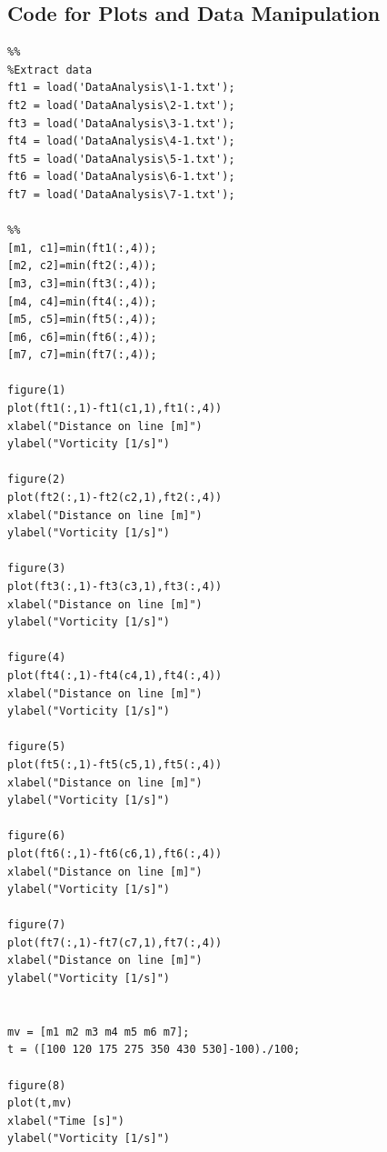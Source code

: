 \documentclass[12pt]{article}
\begin{document}
\subsection{Code for Plots and Data Manipulation}
\begin{lstlisting}
%%
%Extract data
ft1 = load('DataAnalysis\1-1.txt');
ft2 = load('DataAnalysis\2-1.txt');
ft3 = load('DataAnalysis\3-1.txt');
ft4 = load('DataAnalysis\4-1.txt');
ft5 = load('DataAnalysis\5-1.txt');
ft6 = load('DataAnalysis\6-1.txt');
ft7 = load('DataAnalysis\7-1.txt');

%%
[m1, c1]=min(ft1(:,4));
[m2, c2]=min(ft2(:,4));
[m3, c3]=min(ft3(:,4));
[m4, c4]=min(ft4(:,4));
[m5, c5]=min(ft5(:,4));
[m6, c6]=min(ft6(:,4));
[m7, c7]=min(ft7(:,4));

figure(1)
plot(ft1(:,1)-ft1(c1,1),ft1(:,4))
xlabel("Distance on line [m]")
ylabel("Vorticity [1/s]")

figure(2)
plot(ft2(:,1)-ft2(c2,1),ft2(:,4))
xlabel("Distance on line [m]")
ylabel("Vorticity [1/s]")

figure(3)
plot(ft3(:,1)-ft3(c3,1),ft3(:,4))
xlabel("Distance on line [m]")
ylabel("Vorticity [1/s]")

figure(4)
plot(ft4(:,1)-ft4(c4,1),ft4(:,4))
xlabel("Distance on line [m]")
ylabel("Vorticity [1/s]")

figure(5)
plot(ft5(:,1)-ft5(c5,1),ft5(:,4))
xlabel("Distance on line [m]")
ylabel("Vorticity [1/s]")

figure(6)
plot(ft6(:,1)-ft6(c6,1),ft6(:,4))
xlabel("Distance on line [m]")
ylabel("Vorticity [1/s]")

figure(7)
plot(ft7(:,1)-ft7(c7,1),ft7(:,4))
xlabel("Distance on line [m]")
ylabel("Vorticity [1/s]")


mv = [m1 m2 m3 m4 m5 m6 m7];
t = ([100 120 175 275 350 430 530]-100)./100;

figure(8)
plot(t,mv)
xlabel("Time [s]")
ylabel("Vorticity [1/s]")


\end{lstlisting}
\end{document}
